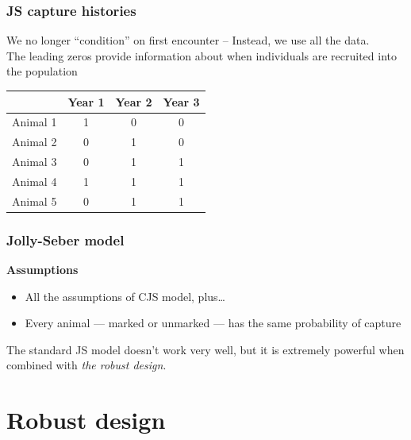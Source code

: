 \documentclass[color=usenames,dvipsnames]{beamer}\usepackage[]{graphicx}\usepackage[]{color}
\begin{document}
\begin{frame}
  \frametitle{JS capture histories}
  {We no longer ``condition'' on first encounter -- Instead, we use
    all the data. \\}
  \vfill
  The leading zeros provide information about when individuals are
  recruited into the population \\
  \vfill
  \begin{center}
    \small
    \begin{tabular}{lccc}
      \hline
      & Year 1 & Year 2 & Year 3 \\
      \hline
      Animal 1 & 1 & 0 & 0 \\
      Animal 2 & 0 & 1 & 0 \\
      Animal 3 & 0 & 1 & 1 \\
      Animal 4 & 1 & 1 & 1 \\
      Animal 5 & 0 & 1 & 1 \\
      \hline
    \end{tabular}
  \end{center}
\end{frame}



\begin{frame}
  \frametitle{Jolly-Seber model}
  {\bf Assumptions}
  \begin{itemize}
    \item All the assumptions of CJS model, plus\dots
    \item Every animal --- marked or unmarked --- has the same
      probability of capture
  \end{itemize}
  \pause
  \vfill
  The standard JS model doesn't work very well, but it is extremely
  powerful when combined with \emph{the robust design}.
\end{frame}



\section{Robust design}



\end{document}
